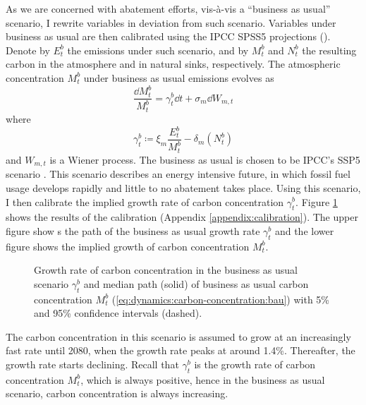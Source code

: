 \documentclass[../../main.tex]{subfiles}
\begin{document}
As we are concerned with abatement efforts, vis-à-vis a ``business as usual'' scenario, I rewrite variables in deviation from such scenario. Variables under business as usual are then calibrated using the IPCC SPSS5 projections (\citeyear{intergovernmental_panel_on_climate_change_climate_2023}). Denote by $E^b_t$ the emissions under such scenario, and by $M^b_t$ and $N^b_t$ the resulting carbon in the atmosphere and in natural sinks, respectively. The atmospheric concentration $M^b_t$ under business as usual emissions evolves as \begin{equation} \label{eq:dynamics:carbon-concentration:bau}
    \frac{\dd{M^b_t}}{M^b_t} = \gamma^b_t \dd{t} + \sigma_m \dd{W}_{m, t}
\end{equation} where \begin{equation}
    \gamma^b_t \coloneqq \xi_m \frac{E^b_t}{M^b_t} - \delta_m(N^b_t)
\end{equation} and $W_{m, t}$ is a Wiener process. The business as usual is chosen to be IPCC's SSP5 scenario \citep{kriegler_fossil-fueled_2017}. This scenario describes an energy intensive future, in which fossil fuel usage develops rapidly and little to no abatement takes place. Using this scenario, I then calibrate the implied growth rate of carbon concentration $\gamma_t^{b}$. Figure \ref{fig:bau-growth} shows the results of the calibration (Appendix \ref{appendix:calibration}). The upper figure show s the path of the business as usual growth rate $\gamma^b_t$ and the lower figure shows the implied growth of carbon concentration $M_t^b$. \begin{figure}[htbp]
    \centering
    
    \caption{Growth rate of carbon concentration in the business as usual scenario $\gamma^b_t$ and median path (solid) of business as usual carbon concentration $M^b_t$ (\ref{eq:dynamics:carbon-concentration:bau}) with 5\% and 95\% confidence intervals (dashed).}
    \label{fig:bau-growth}
\end{figure} \noindent The carbon concentration in this scenario is assumed to grow at an increasingly fast rate until 2080, when the growth rate peaks at around 1.4\%. Thereafter, the growth rate starts declining. Recall that $\gamma^b_t$ is the growth rate of carbon concentration $M^b_t$, which is always positive, hence in the business as usual scenario, carbon concentration is always increasing.
\end{document}

